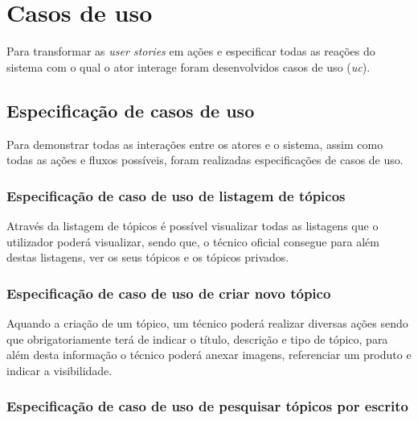 \section{Casos de uso}
Para transformar as \textit{user stories} em ações e especificar todas as reações do sistema com o qual o ator interage foram desenvolvidos casos de uso (\textit{\acrfull{uc}}).


\newpage

\subsection{Especificação de casos de uso}

Para demonstrar todas as interações entre os atores e o sistema, assim como todas as ações e fluxos possíveis, foram realizadas especificações de casos de uso.

\subsubsection{Especificação de caso de uso de listagem de tópicos}

Através da listagem de tópicos é possível visualizar todas as listagens que o utilizador poderá visualizar, sendo que, o técnico oficial consegue para além destas listagens, ver os seus tópicos e os tópicos privados.

%



\newpage

\subsubsection{Especificação de caso de uso de criar novo tópico}

Aquando a criação de um tópico, um técnico poderá realizar diversas ações sendo que obrigatoriamente terá de indicar o título, descrição e tipo de tópico, para além desta informação o técnico poderá anexar imagens, referenciar um produto e indicar a visibilidade.



\newpage

\subsubsection{Especificação de caso de uso de pesquisar tópicos por escrito}

